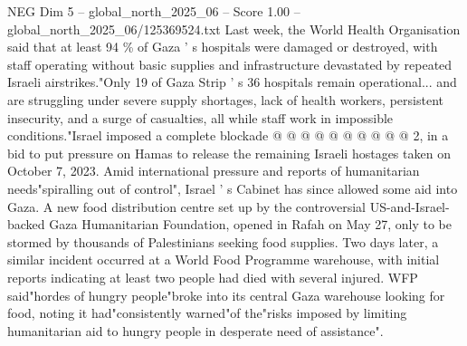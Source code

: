 \begin{textsample}{NEG Dim 5 – global\_north\_2025\_06 – Score 1.00 – global\_north\_2025\_06/125369524.txt}
Last week, the World Health Organisation said that at least 94 \% of Gaza ' s hospitals were damaged or destroyed, with staff operating without basic supplies and infrastructure devastated by repeated Israeli airstrikes."Only 19 of Gaza Strip ' s 36 hospitals remain operational... and are struggling under severe supply shortages, lack of health workers, persistent insecurity, and a surge of casualties, all while staff work in impossible conditions."Israel imposed a complete blockade @ @ @ @ @ @ @ @ @ @ 2, in a bid to put pressure on Hamas to release the remaining Israeli hostages taken on October 7, 2023.
Amid international pressure and reports of humanitarian needs"spiralling out of control", Israel ' s Cabinet has since allowed some aid into Gaza.
A new food distribution centre set up by the controversial US-and-Israel-backed Gaza Humanitarian Foundation, opened in Rafah on May 27, only to be stormed by thousands of Palestinians seeking food supplies.
Two days later, a similar incident occurred at a World Food Programme warehouse, with initial reports indicating at least two people had died with several injured.
WFP said"hordes of hungry people"broke into its central Gaza warehouse looking for food, noting it had"consistently warned"of the"risks imposed by limiting humanitarian aid to hungry people in desperate need of assistance".

\end{textsample}
